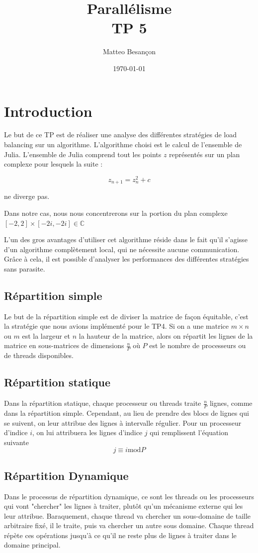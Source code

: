 \documentclass[12pt,a4paper,oneside, titlepage]{report}
\author{Matteo Besançon}
\title {Parallélisme \\ \large TP 5}
\date{\today}
\begin{document}
	\maketitle
	\newpage

	\section*{Introduction}

		Le but de ce TP est de réaliser une analyse des différentes stratégies de load balancing sur un algorithme.
		L'algorithme choisi est le calcul de l'ensemble de Julia. L'ensemble de Julia comprend tout les points $z$ représentés sur un plan complexe pour lesquels la suite :

		$$z_{n+1} = z^{2}_{n} + c$$

		ne diverge pas.

		Dans notre cas, nous nous concentrerons sur la portion du plan complexe $[-2, 2] \times [-2i, -2i] \in \mathbb{C}$

		L'un des gros avantages d'utiliser cet algorithme réside dans le fait qu'il s'agisse d'un algorithme complètement local, qui ne nécessite aucune communication.
		Grâce à cela, il est possible d'analyser les performances des différentes stratégies sans parasite.

		\subsection*{Répartition simple}
			Le but de la répartition simple est de diviser la matrice de façon équitable, c'est la stratégie que nous avions implémenté pour le TP4.
			Si on a une matrice $m \times n$ ou $m$ est la largeur et $n$ la hauteur de la matrice, alors on répartit les lignes de la matrice en sous-matrices de dimensions
			$\frac{n}{P}$ où $P$ est le nombre de processeurs ou de threads disponibles.

		\subsection*{Répartition statique}
			Dans la répartition statique, chaque processeur ou threads traite $\frac{n}{P}$ lignes, comme dans la répartition simple. Cependant, au lieu de prendre des blocs de lignes qui se suivent, on leur attribue des lignes à intervalle régulier.
			Pour un processeur d'indice $i$, on lui attribuera les lignes d'indice $j$ qui remplissent l'équation suivante $$j \equiv i \mathrm{mod} P$$
		\subsection*{Répartition Dynamique}
			Dans le processus de répartition dynamique, ce sont les threads ou les processeurs qui vont "chercher" les lignes à traiter, plutôt qu'un mécanisme externe qui les leur attribue.
			Baraquement, chaque thread va chercher un sous-domaine de taille arbitraire fixé, il le traite, puis va chercher un autre sous domaine. Chaque thread répète ces opérations jusqu'à ce qu'il ne reste plus de lignes à traiter dans le domaine principal.
\end{document}
